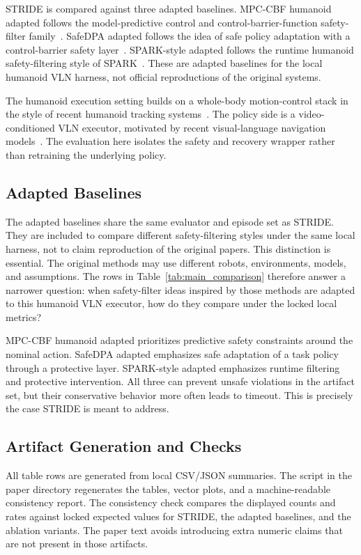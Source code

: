 \documentclass[letterpaper,10pt,conference]{ieeeconf}
\begin{document}
STRIDE is compared against three adapted baselines. MPC-CBF humanoid adapted follows the model-predictive control and control-barrier-function safety-filter family~\cite{zeng2021mpccbf}. SafeDPA adapted follows the idea of safe policy adaptation with a control-barrier safety layer~\cite{xiao2023safedpa}. SPARK-style adapted follows the runtime humanoid safety-filtering style of SPARK~\cite{sun2025spark}. These are adapted baselines for the local humanoid VLN harness, not official reproductions of the original systems.

The humanoid execution setting builds on a whole-body motion-control stack in the style of recent humanoid tracking systems~\cite{luo2025sonic}. The policy side is a video-conditioned VLN executor, motivated by recent visual-language navigation models~\cite{zhang2024navid}. The evaluation here isolates the safety and recovery wrapper rather than retraining the underlying policy.

\subsection{Adapted Baselines}
The adapted baselines share the same evaluator and episode set as STRIDE. They are included to compare different safety-filtering styles under the same local harness, not to claim reproduction of the original papers. This distinction is essential. The original methods may use different robots, environments, models, and assumptions. The rows in Table~\ref{tab:main_comparison} therefore answer a narrower question: when safety-filter ideas inspired by those methods are adapted to this humanoid VLN executor, how do they compare under the locked local metrics?

MPC-CBF humanoid adapted prioritizes predictive safety constraints around the nominal action. SafeDPA adapted emphasizes safe adaptation of a task policy through a protective layer. SPARK-style adapted emphasizes runtime filtering and protective intervention. All three can prevent unsafe violations in the artifact set, but their conservative behavior more often leads to timeout. This is precisely the case STRIDE is meant to address.

\subsection{Artifact Generation and Checks}
All table rows are generated from local CSV/JSON summaries. The script in the paper directory regenerates the tables, vector plots, and a machine-readable consistency report. The consistency check compares the displayed counts and rates against locked expected values for STRIDE, the adapted baselines, and the ablation variants. The paper text avoids introducing extra numeric claims that are not present in those artifacts.
\end{document}
